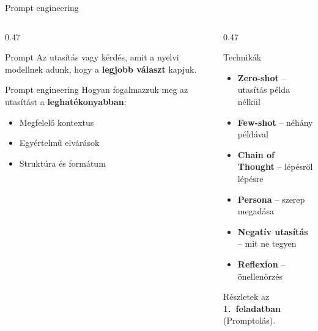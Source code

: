 \documentclass[aspectratio=169, 12pt]{beamer}
\begin{document}
\begin{frame}{Prompt engineering}
  \footnotesize
  \begin{columns}[T,onlytextwidth]
    \begin{column}{0.47\textwidth}
      \begin{block}{Prompt}
        Az utasítás vagy kérdés, amit a nyelvi modellnek adunk, hogy a \textbf{legjobb választ} kapjuk.
      \end{block}

      \vspace{0.3cm}

      \begin{block}{Prompt engineering}
        Hogyan fogalmazzuk meg az utasítást a \textbf{leghatékonyabban}:
        \begin{itemize}\setlength{\itemsep}{1pt}
          \item Megfelelő kontextus
          \item Egyértelmű elvárások
          \item Struktúra és formátum
        \end{itemize}
      \end{block}
    \end{column}
    \begin{column}{0.47\textwidth}
      \begin{exampleblock}{Technikák}
        \begin{itemize}\setlength{\itemsep}{1pt}
          \item \textbf{Zero-shot} -- utasítás példa nélkül
          \item \textbf{Few-shot} -- néhány példával
          \item \textbf{Chain of Thought} -- lépésről lépésre
          \item \textbf{Persona} -- szerep megadása
          \item \textbf{Negatív utasítás} -- mit ne tegyen
          \item \textbf{Reflexion} -- önellenőrzés
        \end{itemize}
      \end{exampleblock}

      \vspace{0.2cm}

      {\small Részletek az \textbf{1.\ feladatban} (Promptolás).}
    \end{column}
  \end{columns}
\end{frame}
\end{document}
